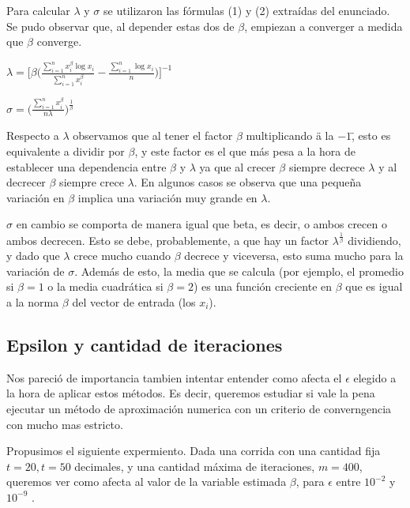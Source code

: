 \indent Para calcular $\lambda$ y $\sigma$ se utilizaron las f\'ormulas 
(1) y (2) extra\'idas del enunciado. Se pudo observar que, al depender estas 
dos de $\beta$, empiezan a converger a medida que $\beta$ converge.
\begin{center}
$\lambda = \big[ \beta \big( \frac{\sum_{i=1}^{n}x_i^\beta \log x_i}{ \sum_{i=1}^{n} x_i^\beta} 
- \frac{\sum_{i=1}^{n} \log x_i}{n} \big)\big]^{-1}$

$\sigma = \big( \frac{\sum_{i=1}^{n} x_i^\beta}{n\lambda}\big)^{\frac{1}{\beta}}$
\end{center}

Respecto a $\lambda$ observamos que al tener el factor $\beta$ multiplicando 
\"a la $-1$\", esto es equivalente a dividir por $\beta$, y este factor es el 
que m\'as pesa a la hora de establecer una dependencia entre $\beta$ y $\lambda$ 
ya que al crecer $\beta$ siempre decrece $\lambda$ y al decrecer $\beta$ siempre
crece $\lambda$. En algunos casos se observa que una peque\~na variaci\'on en 
$\beta$ implica una variaci\'on muy grande en $\lambda$.

$\sigma$ en cambio se comporta de manera igual que beta, es decir, o ambos 
crecen o ambos decrecen. Esto se debe, probablemente, a que hay un factor 
$\lambda^{\frac{1}{\beta}}$ dividiendo, y dado que $\lambda$ crece mucho cuando 
$\beta$ decrece y viceversa, esto suma mucho para la variaci\'on de $\sigma$. 
Adem\'as de esto, la media que se calcula (por ejemplo, el promedio si $\beta = 
1$ o la media cuadr\'atica si $\beta = 2$) es una funci\'on creciente en 
$\beta$ que es igual a la norma $\beta$ del vector de entrada (los $x_i$).


\subsection{Epsilon y cantidad de iteraciones}

\indent Nos pareci\'o de importancia tambien intentar entender como afecta
el $\epsilon$ elegido a la hora de aplicar estos m\'etodos. Es decir,
queremos estudiar si vale la pena ejecutar un m\'etodo de aproximaci\'on numerica
con un criterio de converngencia con mucho mas estricto.

Propusimos el siguiente expermiento. Dada una corrida con una cantidad fija $t=20, t=50$ decimales,
y una cantidad m\'axima de iteraciones, $m=400$, queremos ver como afecta al valor
de la variable estimada $\beta$, para $\epsilon$ entre $10^{-2}$ y $10^{-9}$ .

